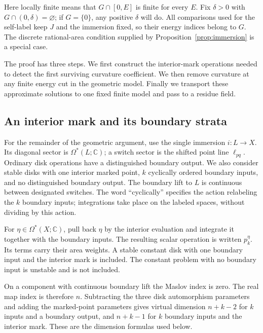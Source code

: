 \documentclass[11pt]{article}
\numberwithin{equation}{section}
\theoremstyle{definition}
\theoremstyle{remark}
\begin{document}
Here locally finite means that $G\cap[0,E]$ is finite for every $E$.
Fix $\delta>0$ with $G\cap(0,\delta)=\varnothing$; if $G=\{0\}$,
any positive $\delta$ will do.  All comparisons used for the self-label
keep $J$ and the immersion fixed, so their energy indices belong to
$G$.  The discrete rational-area condition supplied by
Proposition~\ref{prop:immersion} is a special case.

The proof has three steps.  We first construct the interior-mark
operations needed to detect the first surviving curvature coefficient.
We then remove curvature at any finite energy cut in the geometric
model.  Finally we transport these approximate solutions to one fixed
finite model and pass to a residue field.

\subsection{An interior mark and its boundary strata}
\label{subsec:interior-mark}

For the remainder of the geometric argument, use the single immersion
$i:L\to X$.  Its diagonal sector is $\Omega^*(L;\mathbb C)$; a switch sector is
the shifted point line $\ell_{pq}$.  Ordinary disk operations have a
distinguished boundary output.  We also consider stable disks with one
interior marked point, $k$ cyclically ordered boundary inputs, and no
distinguished boundary output.  The boundary lift to $L$ is continuous
between designated switches.  The word ``cyclically'' specifies the
action relabeling the $k$ boundary inputs; integrations take place on
the labeled spaces, without dividing by this action.

For $\eta\in\Omega^*(X;\mathbb C)$, pull back $\eta$ by the interior evaluation
and integrate it together with the boundary inputs.  The resulting
scalar operation is written $p^\eta_k$.  Its terms carry their area
weights.  A stable constant disk with one boundary input and the
interior mark is included.  The constant problem with no boundary input
is unstable and is not included.

On a component with continuous boundary lift the Maslov index is zero.
The real map index is therefore $n$.  Subtracting the three disk
automorphism parameters and adding the marked-point parameters gives
virtual dimension $n+k-2$ for $k$ inputs and a boundary output, and
$n+k-1$ for $k$ boundary inputs and the interior mark.  These are the
dimension formulas used below.
\end{document}

